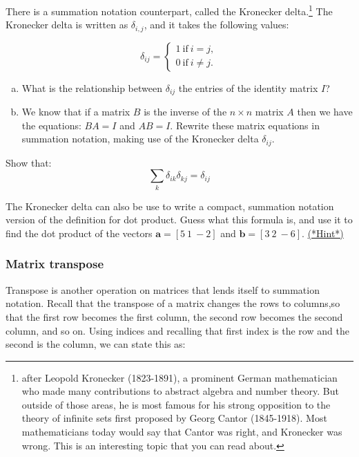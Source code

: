 There is a summation notation counterpart, called the {\bfi Kronecker delta}.\footnote{after Leopold Kronecker (1823-1891), a prominent German mathematician who made many contributions to abstract algebra and number theory. But outside of those areas, he is most famous for his strong opposition to the theory of infinite sets first proposed by Georg Cantor (1845-1918).  Most mathematicians today would say that Cantor was right, and Kronecker was wrong. This is an interesting topic that you can read about.} The Kronecker delta is written as $\delta_{i,j}$, and it takes the following values:

\[ \delta_{ij}=
\begin{cases}
1 ~ \text{if} ~ i=j,  \\
0 ~ \text{if} ~ i \neq j.
\end{cases} \]

\begin{exercise}
\begin{enumerate}[(a)]
\item
What is the relationship between $\delta_{ij}$ the entries of the identity matrix $I$?
\item
We know that if a matrix $B$ is the inverse of the $n \times n$ matrix $A$ then we have the equations: $BA = I$ and $AB = I$.  Rewrite these matrix equations in summation notation, making use of the Kronecker delta $\delta_{ij}$.
\end{enumerate}
\end{exercise}

\begin{exercise}
Show that:
\[ \sum_k  \delta_{ik}\delta_{kj}=\delta_{ij}\]
\end{exercise}

\begin{exercise}\label{exercise:Sigma:kronecker}
The Kronecker delta can also be use to write a compact, summation notation version of the definition for dot product.  Guess what this formula is, and use it to find the dot product of the vectors $\textbf{a}=[5~1~-2]$ and $\textbf{b}=[3~2~-6]$.
\hyperref[sec:sigma:hints]{(*Hint*)} 
\end{exercise}

\subsubsection*{Matrix transpose}
Transpose is another operation on matrices that lends itself to summation notation.  Recall that the transpose of a matrix changes the rows to columns,so that the first row becomes the first column, the second row becomes the second column, and so on.   Using indices and recalling that first index is the row and the second is the column, we can state this as:

